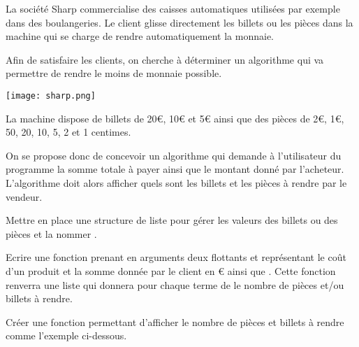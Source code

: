 \begin{minipage}[c]{.6\linewidth}
La société Sharp commercialise des caisses automatiques utilisées par exemple dans des boulangeries. Le client glisse directement les billets ou les pièces dans la machine qui se charge de rendre automatiquement la monnaie. 
\begin{obj}
Afin de satisfaire les clients, on cherche à déterminer un algorithme qui va permettre de rendre le moins de monnaie possible. 
\end{obj}
\end{minipage}\hfill
\begin{minipage}[c]{.37\linewidth}
\begin{center}
\texttt{[image: sharp.png]}
\end{center}
\end{minipage}


La machine dispose de billets de 20€, 10€ et 5€ ainsi que des pièces de 2€, 1€, 50, 20, 10, 5, 2 et 1 centimes. 

On se propose donc de concevoir un algorithme qui demande à l'utilisateur du programme la somme totale à payer ainsi que le montant donné par l'acheteur. L'algorithme doit alors afficher quels sont les billets et les pièces à rendre par le vendeur. 



\question{}
Mettre en place une structure de liste pour gérer les valeurs des billets ou des pièces et la nommer .


\question{}
Ecrire une fonction  prenant en arguments deux flottants  et  représentant le coût d'un produit et la somme donnée par le client en € ainsi que . Cette fonction renverra une liste  qui donnera pour chaque terme de  le nombre de pièces et/ou billets à rendre.

\question{} Créer une fonction  permettant d'afficher le nombre de pièces et billets à rendre comme l'exemple ci-dessous.

